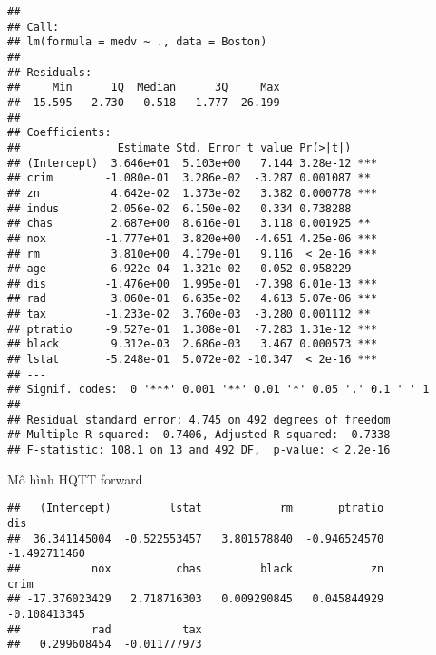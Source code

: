 \documentclass[
]{article}
\newenvironment{Shaded}{\begin{snugshade}}{\end{snugshade}}
\newcommand{\AttributeTok}[1]{\textcolor[rgb]{0.77,0.63,0.00}{#1}}
\newcommand{\CommentTok}[1]{\textcolor[rgb]{0.56,0.35,0.01}{\textit{#1}}}
\newcommand{\DecValTok}[1]{\textcolor[rgb]{0.00,0.00,0.81}{#1}}
\newcommand{\FunctionTok}[1]{\textcolor[rgb]{0.00,0.00,0.00}{#1}}
\newcommand{\NormalTok}[1]{#1}
\newcommand{\OtherTok}[1]{\textcolor[rgb]{0.56,0.35,0.01}{#1}}
\newcommand{\SpecialCharTok}[1]{\textcolor[rgb]{0.00,0.00,0.00}{#1}}
\newcommand{\StringTok}[1]{\textcolor[rgb]{0.31,0.60,0.02}{#1}}
\begin{document}
\begin{verbatim}
## 
## Call:
## lm(formula = medv ~ ., data = Boston)
## 
## Residuals:
##     Min      1Q  Median      3Q     Max 
## -15.595  -2.730  -0.518   1.777  26.199 
## 
## Coefficients:
##               Estimate Std. Error t value Pr(>|t|)    
## (Intercept)  3.646e+01  5.103e+00   7.144 3.28e-12 ***
## crim        -1.080e-01  3.286e-02  -3.287 0.001087 ** 
## zn           4.642e-02  1.373e-02   3.382 0.000778 ***
## indus        2.056e-02  6.150e-02   0.334 0.738288    
## chas         2.687e+00  8.616e-01   3.118 0.001925 ** 
## nox         -1.777e+01  3.820e+00  -4.651 4.25e-06 ***
## rm           3.810e+00  4.179e-01   9.116  < 2e-16 ***
## age          6.922e-04  1.321e-02   0.052 0.958229    
## dis         -1.476e+00  1.995e-01  -7.398 6.01e-13 ***
## rad          3.060e-01  6.635e-02   4.613 5.07e-06 ***
## tax         -1.233e-02  3.760e-03  -3.280 0.001112 ** 
## ptratio     -9.527e-01  1.308e-01  -7.283 1.31e-12 ***
## black        9.312e-03  2.686e-03   3.467 0.000573 ***
## lstat       -5.248e-01  5.072e-02 -10.347  < 2e-16 ***
## ---
## Signif. codes:  0 '***' 0.001 '**' 0.01 '*' 0.05 '.' 0.1 ' ' 1
## 
## Residual standard error: 4.745 on 492 degrees of freedom
## Multiple R-squared:  0.7406, Adjusted R-squared:  0.7338 
## F-statistic: 108.1 on 13 and 492 DF,  p-value: < 2.2e-16
\end{verbatim}

Mô hình HQTT forward

\begin{Shaded}
\end{Shaded}

\begin{verbatim}
##   (Intercept)         lstat            rm       ptratio           dis 
##  36.341145004  -0.522553457   3.801578840  -0.946524570  -1.492711460 
##           nox          chas         black            zn          crim 
## -17.376023429   2.718716303   0.009290845   0.045844929  -0.108413345 
##           rad           tax 
##   0.299608454  -0.011777973
\end{verbatim}
\end{document}
